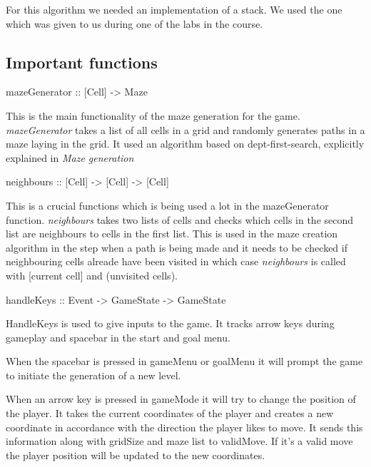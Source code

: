 \documentclass[12pt, a4paper]{article}
\begin{document}
For this algorithm we needed an implementation of a stack. We used the one which was given to us during one of the labs in the course.\cite{stackLab} 





\subsection{Important functions}

\begin{code}
    mazeGenerator :: [Cell] -> Maze
\end{code}
This is the main functionality of the maze generation for the game. \textit{mazeGenerator} takes a list of all cells in a grid and randomly generates paths in a maze laying in the grid. It used an algorithm based on dept-first-search, explicitly explained in \textit{Maze generation}



\begin{code}
    neighbours :: [Cell] -> [Cell] -> [Cell]
\end{code}
This is a crucial functions which is being used a lot in the mazeGenerator function. \textit{neighbours} takes two lists of cells and checks which cells in the second list are neighbours to cells in the first list. This is used in the maze creation algorithm in the step when a path is being made and it needs to be checked if neighbouring cells alreade have been visited in which case \textit{neighbours} is called with [current cell] and (unvisited cells).


\begin{code}
    handleKeys :: Event -> GameState -> GameState
\end{code}

HandleKeys is used to give inputs to the game. It tracks arrow keys during gameplay and spacebar in the start and goal menu.\cite{Event} 
 
When the spacebar is pressed in gameMenu or goalMenu it will prompt the game to initiate the generation of a new level.
 
When an arrow key is pressed in gameMode it will try to change the position of the player. It takes the current coordinates of the player and creates a new coordinate in accordance with the direction the player likes to move. It sends this information along with gridSize and maze list to validMove. If it’s a valid move the player position will be updated to the new coordinates. 
\end{document}
